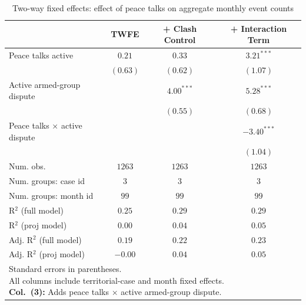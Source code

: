 
\begin{table}
\caption{Two-way fixed effects: effect of peace talks on aggregate monthly event counts}
\begin{center}
\begin{tabular}{l c c c}
\toprule
 & TWFE & + Clash Control & + Interaction Term \\
\midrule
Peace talks active           & $0.21$   & $0.33$       & $3.21^{***}$  \\
                             & $(0.63)$ & $(0.62)$     & $(1.07)$      \\
Active armed-group dispute   &          & $4.00^{***}$ & $5.28^{***}$  \\
                             &          & $(0.55)$     & $(0.68)$      \\
Peace talks × active dispute &          &              & $-3.40^{***}$ \\
                             &          &              & $(1.04)$      \\
\midrule
Num. obs.                    & $1263$   & $1263$       & $1263$        \\
Num. groups: case id        & $3$      & $3$          & $3$           \\
Num. groups: month id       & $99$     & $99$         & $99$          \\
R$^2$ (full model)           & $0.25$   & $0.29$       & $0.29$        \\
R$^2$ (proj model)           & $0.00$   & $0.04$       & $0.05$        \\
Adj. R$^2$ (full model)      & $0.19$   & $0.22$       & $0.23$        \\
Adj. R$^2$ (proj model)      & $-0.00$  & $0.04$       & $0.05$        \\
\bottomrule
\multicolumn{4}{l}{\scriptsize{\parbox{\linewidth}{Standard errors in parentheses.\\[0.35em] All columns include territorial-case and month fixed effects.\\[0.35em] \textbf{Col.~(3):} Adds peace talks $\times$ active armed-group dispute.}}}
\end{tabular}
\label{tab:results_twfe}
\end{center}
\end{table}
